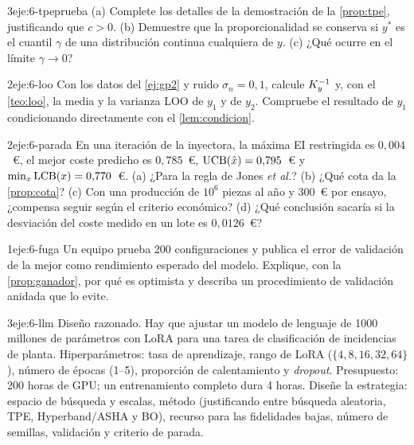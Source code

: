 \begin{ejercicio}{3}{eje:6-tpeprueba}
(a) Complete los detalles de la demostración de la \cref{prop:tpe}, justificando que $c>0$. (b) Demuestre que la proporcionalidad se conserva si $y^*$ es el cuantil $\gamma$ de una distribución continua cualquiera de $y$. (c) ¿Qué ocurre en el límite $\gamma\to 0$?
\end{ejercicio}

\begin{ejercicio}{2}{eje:6-loo}
Con los datos del \cref{ej:gp2} y ruido $\sigma_n=0{,}1$, calcule $K_{y}^{-1}$ y, con el \cref{teo:loo}, la media y la varianza LOO de $y_1$ y de $y_2$. Compruebe el resultado de $y_1$ condicionando directamente con el \cref{lem:condicion}.
\end{ejercicio}

\begin{ejercicio}{2}{eje:6-parada}
En una iteración de la inyectora, la máxima EI restringida es $0{,}004$~€, el mejor coste predicho es $0{,}785$~€, $\operatorname{UCB}(\hat x)=0{,}795$~€ y $\min_x\operatorname{LCB}(x)=0{,}770$~€. (a) ¿Para la regla de Jones \emph{et al.}? (b) ¿Qué cota da la \cref{prop:cota}? (c) Con una producción de $10^6$ piezas al año y 300~€ por ensayo, ¿compensa seguir según el criterio económico? (d) ¿Qué conclusión sacaría si la desviación del coste medido en un lote es $0{,}0126$~€?
\end{ejercicio}

\begin{ejercicio}{1}{eje:6-fuga}
Un equipo prueba 200 configuraciones y publica el error de validación de la mejor como rendimiento esperado del modelo. Explique, con la \cref{prop:ganador}, por qué es optimista y describa un procedimiento de validación anidada que lo evite.
\end{ejercicio}

\begin{ejercicio}{3}{eje:6-llm}
Diseño razonado. Hay que ajustar un modelo de lenguaje de 1000 millones de parámetros con LoRA para una tarea de clasificación de incidencias de planta. Hiperparámetros: tasa de aprendizaje, rango de LoRA ($\{4,8,16,32,64\}$), número de épocas (1–5), proporción de calentamiento y \emph{dropout}. Presupuesto: 200 horas de GPU; un entrenamiento completo dura 4 horas. Diseñe la estrategia: espacio de búsqueda y escalas, método (justificando entre búsqueda aleatoria, TPE, Hyperband/ASHA y BO), recurso para las fidelidades bajas, número de semillas, validación y criterio de parada.
\end{ejercicio}
